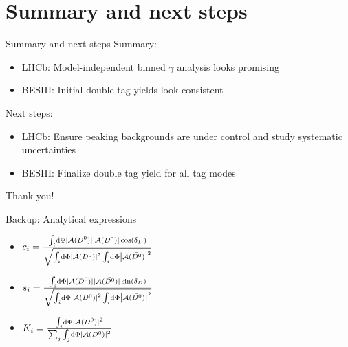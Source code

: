 \documentclass{beamer}
\begin{document}
\section{Summary and next steps}
\begin{frame}{Summary and next steps}
  Summary:
  \begin{itemize}
    \setlength\itemsep{1.0em}
    \item{LHCb: Model-independent binned $\gamma$ analysis looks promising}
    \item{BESIII: Initial double tag yields look consistent}
  \end{itemize}
  \vspace{0.3cm}
  Next steps:
  \begin{itemize}
    \setlength\itemsep{1.0em}
    \item{LHCb: Ensure peaking backgrounds are under control and study systematic uncertainties}
    \item{BESIII: Finalize double tag yield for all tag modes}
  \end{itemize}
  \vspace{0.5cm}
  \begin{center}
    {\huge Thank you!}
  \end{center}
\end{frame}

\begin{frame}{Backup: Analytical expressions}
  \begin{itemize}
    \setlength\itemsep{1.5em}
    \item{$c_i = \frac{\int_i\dd{\Phi}|\mathcal{A}(D^0)||\mathcal{A}(\bar{D^0})|\cos(\delta_D)}{\sqrt{\int_i\dd{\Phi}\abs{\mathcal{A}(D^0)}^2\int_i\dd{\Phi}\abs{\mathcal{A}(\bar{D^0})}^2}}$}
    \item{$s_i = \frac{\int_i\dd{\Phi}|\mathcal{A}(D^0)||\mathcal{A}(\bar{D^0})|\sin(\delta_D)}{\sqrt{\int_i\dd{\Phi}\abs{\mathcal{A}(D^0)}^2\int_i\dd{\Phi}\abs{\mathcal{A}(\bar{D^0})}^2}}$}
    \item{$K_i = \frac{\int_i\dd{\Phi}|\mathcal{A}(D^0)|^2}{\sum_j\int_j\dd{\Phi}\abs{\mathcal{A}(D^0)}^2}$}
  \end{itemize}
\end{frame}
\end{document}
